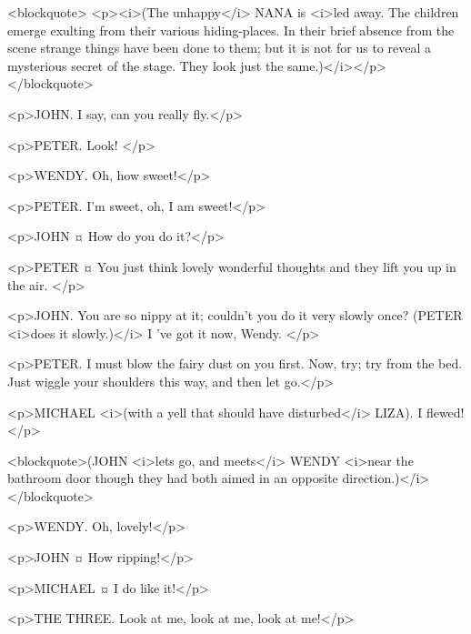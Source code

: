 <blockquote> <p><i>(The unhappy</i> NANA is <i>led away. The children emerge exulting from their various hiding-places. In their brief absence from the scene strange things have been done to them; but it is not for us to reveal a mysterious secret of the stage. They look just the same.)</i></p> </blockquote>

<p>JOHN. I say, can you really fly.</p>

<p>PETER. Look!
</p>

<p>WENDY. Oh, how sweet!</p>

<p>PETER. I'm sweet, oh, I am sweet!</p>


<p>JOHN ¤
How do you do it?</p>

<p>PETER ¤
You just think lovely wonderful thoughts and they lift you up in the air.
</p>

<p>JOHN. You are so nippy at it; couldn't you do it very slowly once? (PETER <i>does it slowly.)</i> I 've got it now, Wendy.
</p>

<p>PETER. I must blow the fairy dust on you first.
Now, try; try from the bed. Just wiggle your shoulders this way, and then let go.</p>


<p>MICHAEL <i>(with a yell that should have disturbed</i> LIZA). I flewed!</p>

<blockquote>(JOHN <i>lets go, and meets</i> WENDY <i>near the bathroom door though they had both aimed in an opposite direction.)</i></blockquote>

<p>WENDY. Oh, lovely!</p>

<p>JOHN ¤
How ripping!</p>

<p>MICHAEL ¤
I do like it!</p>

<p>THE THREE. Look at me, look at me, look at me!</p>


